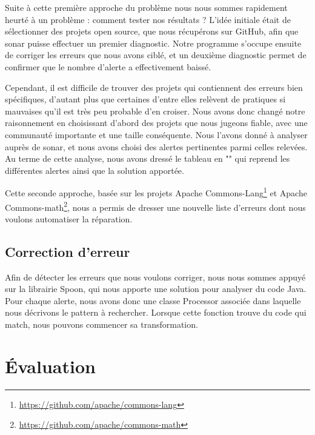 \documentclass[a4paper]{article}
\begin{document}
\par Suite à cette première approche du problème nous nous sommes rapidement heurté à un problème : comment tester nos résultats ? L'idée initiale était de sélectionner des projets open source, que nous récupérons sur GitHub, afin que sonar puisse effectuer un premier diagnostic. Notre programme s'occupe ensuite de corriger les erreurs que nous avons ciblé, et un deuxième diagnostic permet de confirmer que le nombre d'alerte a effectivement baissé. 
\\
\par Cependant, il est difficile de trouver des projets qui contiennent des erreurs bien spécifiques, d'autant plus que certaines d'entre elles relèvent de pratiques si mauvaises qu'il est très peu probable d'en croiser. Nous avons donc changé notre raisonnement en choisissant d'abord des projets que nous jugeons fiable, avec une communauté importante et une taille conséquente. Nous l'avons donné à analyser auprès de sonar, et nous avons choisi des alertes pertinentes parmi celles relevées. Au terme de cette analyse, nous avons dressé le tableau en "" qui reprend les différentes alertes ainsi que la solution apportée.
\\
\par Cette seconde approche, basée sur les projets Apache Commons-Lang\footnote{\url{https://github.com/apache/commons-lang}} et Apache Commons-math\footnote{\url{https://github.com/apache/commons-math}}, nous a permis de dresser une nouvelle liste d'erreurs dont nous voulons automatiser la réparation.


\subsection{Correction d'erreur}
\par Afin de détecter les erreurs que nous voulons corriger, nous nous sommes appuyé sur la librairie Spoon, qui nous apporte une solution pour analyser du code Java. Pour chaque alerte, nous avons donc une classe Processor associée dans laquelle nous décrivons le pattern à rechercher. Lorsque cette fonction trouve du code qui match, nous pouvons commencer sa transformation.


\section{Évaluation}
\end{document}
